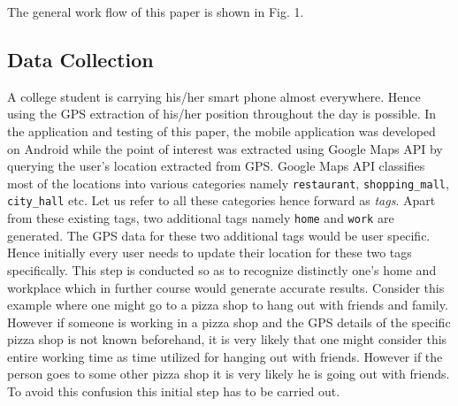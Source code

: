 \documentclass[conference]{IEEEtran}
\begin{document}
The general work flow of this paper is shown in Fig. 1.

\subsection{Data Collection}

A college student is carrying his/her smart phone almost everywhere. Hence using the GPS extraction of his/her position throughout the day is possible. In the application and testing of this paper, the mobile application was developed on Android while the point of interest was extracted using Google Maps API by querying the user\rq s location extracted from GPS. Google Maps API classifies most of the locations into various categories namely \texttt{restaurant}, \texttt{shopping\_mall}, \texttt{city\_hall} etc. Let us refer to all these categories hence forward as \textit{tags}. Apart from these existing tags, two additional tags namely \texttt{home} and \texttt{work} are generated. The GPS data for these two additional tags would be user specific. Hence initially every user needs to update their location for these two tags specifically. This step is conducted so as to recognize distinctly one\rq s home and workplace which in further course would generate accurate results. Consider this example where one might go to a pizza shop to hang out with friends and family. However if someone is working in a pizza shop and the GPS details of the specific pizza shop is not known beforehand, it is very likely that one might consider this entire working time as time utilized for hanging out with friends. However if the person goes to some other pizza shop it is very likely he is going out with friends. To avoid this confusion this initial step has to be carried out.
\end{document}
